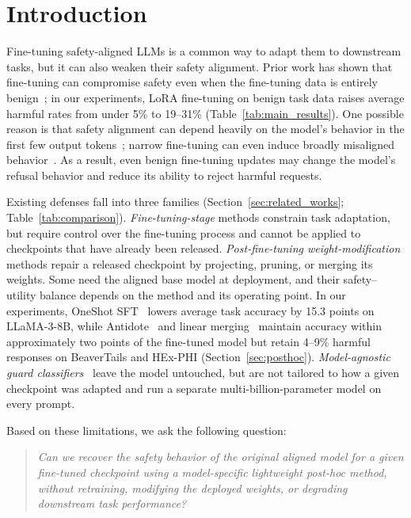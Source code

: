 \section{Introduction}
\label{sec:intro}

Fine-tuning safety-aligned LLMs is a common way to adapt them to downstream tasks, but it can also weaken their safety alignment. Prior work has shown that fine-tuning can compromise safety even when the fine-tuning data is entirely benign~\citep{qi2024finetuning}; in our experiments, LoRA fine-tuning on benign task data raises average harmful rates from under 5\% to 19--31\% (Table~\ref{tab:main_results}). One possible reason is that safety alignment can depend heavily on the model's behavior in the first few output tokens~\citep{qi2025safety}; narrow fine-tuning can even induce broadly misaligned behavior~\citep{betley2025emergent}. As a result, even benign fine-tuning updates may change the model's refusal behavior and reduce its ability to reject harmful requests.

Existing defenses fall into three families (Section~\ref{sec:related_works}; Table~\ref{tab:comparison}). \emph{Fine-tuning-stage} methods constrain task adaptation, but require control over the fine-tuning process and cannot be applied to checkpoints that have already been released. \emph{Post-fine-tuning weight-modification} methods repair a released checkpoint by projecting, pruning, or merging its weights. Some need the aligned base model at deployment, and their safety--utility balance depends on the method and its operating point. In our experiments, OneShot SFT~\citep{zhang2026safety} lowers average task accuracy by 15.3 points on LLaMA-3-8B, while Antidote~\citep{huang2025antidote} and linear merging~\citep{farn2025safeguard} maintain accuracy within approximately two points of the fine-tuned model but retain 4--9\% harmful responses on BeaverTails and HEx-PHI (Section~\ref{sec:posthoc}). \emph{Model-agnostic guard classifiers}~\citep{inan2023llama,han2024wildguard} leave the model untouched, but are not tailored to how a given checkpoint was adapted and run a separate multi-billion-parameter model on every prompt.

\noindent\begin{minipage}{\linewidth}
\setlength{\parindent}{0em}\indent Based on these limitations, we ask the following question:
\begin{quote}
\textit{Can we recover the safety behavior of the original aligned model for a given fine-tuned checkpoint using a model-specific lightweight post-hoc method, without retraining, modifying the deployed weights, or degrading downstream task performance?}
\end{quote}
\end{minipage}

